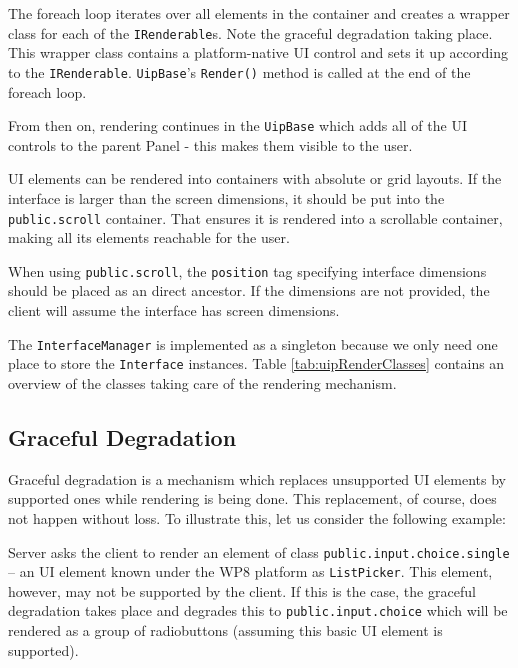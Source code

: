 The foreach loop iterates over all elements in the container and creates a wrapper class for each of the \texttt{IRenderable}s. Note the graceful degradation taking place. This wrapper class contains a platform-native UI control and sets it up according to the \texttt{IRenderable}. \texttt{UipBase}'s \texttt{Render()} method is called at the end of the foreach loop.

From then on, rendering continues in the \texttt{UipBase} which adds all of the UI controls to the parent Panel - this makes them visible to the user.

\pagebreak


UI elements can be rendered into containers with absolute or grid layouts. If the interface is larger than the screen dimensions, it should be put into the \texttt{public.scroll} container. That ensures it is rendered into a scrollable container, making all its elements reachable for the user.

When using \texttt{public.scroll}, the \texttt{position} tag specifying interface dimensions should be placed as an direct ancestor. If the dimensions are not provided, the client will assume the interface has screen dimensions.

The \texttt{InterfaceManager} is implemented as a singleton because we only need one place to store the \texttt{Interface} instances. Table \ref{tab:uipRenderClasses} contains an overview of the classes taking care of the rendering mechanism.



\subsection{Graceful Degradation}
Graceful degradation is a mechanism which replaces unsupported UI elements by supported ones while rendering is being done. This replacement, of course, does not happen without loss. To illustrate this, let us consider the following example:

Server asks the client to render an element of class \texttt{public.input.choice.\linebreak single} – an UI element known under the WP8 platform as \texttt{ListPicker}. This element, however, may not be supported by the client. If this is the case, the graceful degradation takes place and degrades this to \texttt{public.input.choice} which will be rendered as a group of radiobuttons (assuming this basic UI element is supported).

